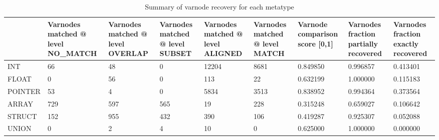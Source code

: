 \begin{table}[t]
\centering
\caption{Summary of varnode recovery for each metatype}
\label{table:metatype-recovery-summary-with-levels}
\begin{tabular}{lp{2.2cm}p{2.2cm}p{2.2cm}p{2.2cm}p{2.2cm}p{2.2cm}p{2.2cm}p{2.2cm}}
\toprule
{} &  Varnodes matched @ level NO\_MATCH &  Varnodes matched @ level OVERLAP &  Varnodes matched @ level SUBSET &  Varnodes matched @ level ALIGNED &  Varnodes matched @ level MATCH &  Varnode comparison score [0,1] &  Varnodes fraction partially recovered &  Varnodes fraction exactly recovered \\
\midrule
INT     &                                 66 &                                48 &                                0 &                             12204 &                            8681 &                        0.849850 &                               0.996857 &                             0.413401 \\
FLOAT   &                                  0 &                                56 &                                0 &                               113 &                              22 &                        0.632199 &                               1.000000 &                             0.115183 \\
POINTER &                                 53 &                                 4 &                                0 &                              5834 &                            3513 &                        0.838952 &                               0.994364 &                             0.373564 \\
ARRAY   &                                729 &                               597 &                              565 &                                19 &                             228 &                        0.315248 &                               0.659027 &                             0.106642 \\
STRUCT  &                                152 &                               955 &                              432 &                               390 &                             106 &                        0.419287 &                               0.925307 &                             0.052088 \\
UNION   &                                  0 &                                 2 &                                4 &                                10 &                               0 &                        0.625000 &                               1.000000 &                             0.000000 \\
\bottomrule
\end{tabular}
\end{table}
